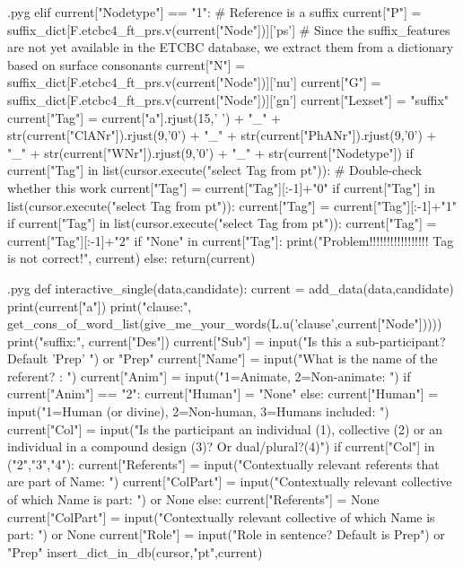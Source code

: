 \documentclass{report}
\makeatletter
\newenvironment{python}{%
  \VerbatimEnvironment
  \minted@resetoptions
  \setkeys{minted@opt}{}
      \begin{VerbatimOut}{\jobname.pyg}}
{%
      \end{VerbatimOut}
      \minted@pygmentize{python}
      \DeleteFile{\jobname.pyg}}
\makeatother
\begin{document}
\begin{python}
    elif current["Nodetype"] == "1": # Reference is a suffix
        current["P"] = suffix_dict[F.etcbc4_ft_prs.v(current["Node"])]['ps']    # Since the suffix_features are not yet available in the ETCBC database, we extract them from a dictionary based on surface consonants
        current["N"] = suffix_dict[F.etcbc4_ft_prs.v(current["Node"])]['nu']
        current["G"] = suffix_dict[F.etcbc4_ft_prs.v(current["Node"])]['gn']
        current["Lexset"] = "suffix"
    current["Tag"] = current["a"].rjust(15,' ') + "_" + str(current["ClANr"]).rjust(9,'0') + "_" + str(current["PhANr"]).rjust(9,'0') + "_" + str(current["WNr"]).rjust(9,'0') + "_" + str(current["Nodetype"])
    if current["Tag"] in list(cursor.execute("select Tag from pt")): # Double-check whether this work
        current["Tag"] = current["Tag"][:-1]+"0"
        if current["Tag"] in list(cursor.execute("select Tag from pt")):
            current["Tag"] = current["Tag"][:-1]+"1"
            if current["Tag"] in list(cursor.execute("select Tag from pt")):
                current["Tag"] = current["Tag"][:-1]+"2"
    if "None" in current["Tag"]:
        print("Problem!!!!!!!!!!!!!!!!! Tag is not correct!", current)
    else:
        return(current)

\end{python}

\begin{python}
def interactive_single(data,candidate):
    current = add_data(data,candidate)
    print(current["a"])
    print("clause:", get_cons_of_word_list(give_me_your_words(L.u('clause',current["Node"])))) 
    print("suffix:", current["Des"])
    current["Sub"] = input("Is this a sub-participant? Default 'Prep' ") or "Prep" 
    current["Name"] = input("What is the name of the referent? : ")
    current["Anim"] = input("1=Animate, 2=Non-animate: ")
    if current["Anim"] == "2":
        current["Human"] = "None"
    else:
        current["Human"] = input("1=Human (or divine), 2=Non-human, 3=Humans included: ")
    current["Col"] = input("Is the participant an individual (1), collective (2) or an individual in a compound design (3)? Or dual/plural?(4)")
    if current["Col"] in ("2","3","4"):
        current["Referents"] = input("Contextually relevant referents that are part of Name: ")
        current["ColPart"] = input("Contextually relevant collective of which Name is part: ") or None
    else:
        current["Referents"] = None
        current["ColPart"] = input("Contextually relevant collective of which Name is part: ") or None
    current["Role"] = input("Role in sentence? Default is Prep") or "Prep" 
    insert_dict_in_db(cursor,"pt",current)

\end{python}
\end{document}
